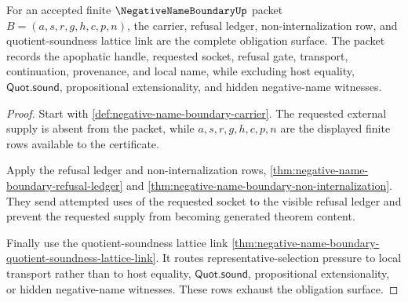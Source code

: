 \begin{theorem}
\label{thm:negative-name-boundary-obligation-closure}
For an accepted finite $\NegativeNameBoundaryUp$ packet
$B=(a,s,r,g,h,c,p,n)$, the carrier, refusal ledger, non-internalization row, and
quotient-soundness lattice link are the complete obligation surface. The packet
records the apophatic handle, requested socket, refusal gate, transport,
continuation, provenance, and local name, while excluding host equality,
$\mathsf{Quot.sound}$, propositional extensionality, and hidden negative-name
witnesses.
\end{theorem}
\begin{proof}
Start with \autoref{def:negative-name-boundary-carrier}. The requested external
supply is absent from the packet, while $a,s,r,g,h,c,p,n$ are the displayed
finite rows available to the certificate.

Apply the refusal ledger and non-internalization rows,
\autoref{thm:negative-name-boundary-refusal-ledger} and
\autoref{thm:negative-name-boundary-non-internalization}. They send attempted
uses of the requested socket to the visible refusal ledger and prevent the
requested supply from becoming generated theorem content.

Finally use the quotient-soundness lattice link
\autoref{thm:negative-name-boundary-quotient-soundness-lattice-link}. It routes
representative-selection pressure to local transport rather than to host
equality, $\mathsf{Quot.sound}$, propositional extensionality, or hidden
negative-name witnesses. These rows exhaust the obligation surface.
\end{proof}

